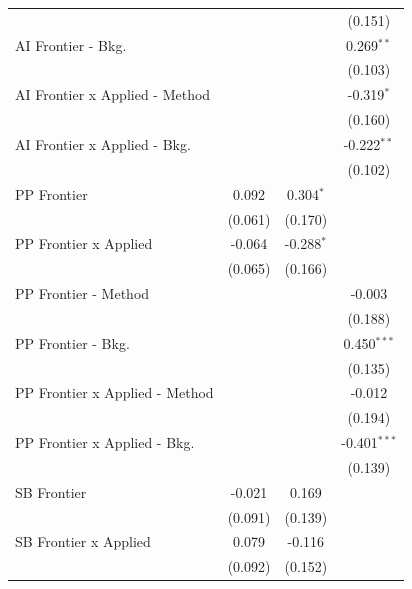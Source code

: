 \begin{tabular}{lccc}
                                  &             &              & (0.151)\\   
   AI Frontier - Bkg.             &             &              & 0.269$^{**}$\\   
                                  &             &              & (0.103)\\   
   AI Frontier x Applied - Method &             &              & -0.319$^{*}$\\   
                                  &             &              & (0.160)\\   
   AI Frontier x Applied - Bkg.   &             &              & -0.222$^{**}$\\   
                                  &             &              & (0.102)\\   
   PP Frontier                    & 0.092       & 0.304$^{*}$  &   \\   
                                  & (0.061)     & (0.170)      &   \\   
   PP Frontier x Applied          & -0.064      & -0.288$^{*}$ &   \\   
                                  & (0.065)     & (0.166)      &   \\   
   PP Frontier - Method           &             &              & -0.003\\   
                                  &             &              & (0.188)\\   
   PP Frontier - Bkg.             &             &              & 0.450$^{***}$\\   
                                  &             &              & (0.135)\\   
   PP Frontier x Applied - Method &             &              & -0.012\\   
                                  &             &              & (0.194)\\   
   PP Frontier x Applied - Bkg.   &             &              & -0.401$^{***}$\\   
                                  &             &              & (0.139)\\   
   SB Frontier                    & -0.021      & 0.169        &   \\   
                                  & (0.091)     & (0.139)      &   \\   
   SB Frontier x Applied          & 0.079       & -0.116       &   \\   
                                  & (0.092)     & (0.152)      &   \\   

\end{tabular}
